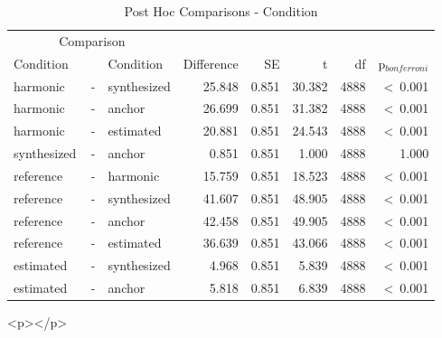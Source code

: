 \documentclass[a4paper,man,hidelinks,floatsintext]{apa7}
\begin{document}
    
\begin{table}[!htbp]
\caption{Post Hoc Comparisons - Condition}
\label{tab:Table_6}
\begin{adjustbox}{max size={\columnwidth}{\textheight}}
\centering
\begin{tabular}{lrlrrrrr}
\hline
\multicolumn{3}{c}{Comparison} & \multicolumn{5}{c}{~} \\
\cline{1-3}
Condition   & ~ & Condition   & Difference &    SE &      t &   df & p$_{bonferroni}$ \\
\hline
harmonic    & - & synthesized &     25.848 & 0.851 & 30.382 & 4888 &  \textless~0.001 \\
harmonic    & - & anchor      &     26.699 & 0.851 & 31.382 & 4888 &  \textless~0.001 \\
harmonic    & - & estimated   &     20.881 & 0.851 & 24.543 & 4888 &  \textless~0.001 \\
synthesized & - & anchor      &      0.851 & 0.851 &  1.000 & 4888 &            1.000 \\
reference   & - & harmonic    &     15.759 & 0.851 & 18.523 & 4888 &  \textless~0.001 \\
reference   & - & synthesized &     41.607 & 0.851 & 48.905 & 4888 &  \textless~0.001 \\
reference   & - & anchor      &     42.458 & 0.851 & 49.905 & 4888 &  \textless~0.001 \\
reference   & - & estimated   &     36.639 & 0.851 & 43.066 & 4888 &  \textless~0.001 \\
estimated   & - & synthesized &      4.968 & 0.851 &  5.839 & 4888 &  \textless~0.001 \\
estimated   & - & anchor      &      5.818 & 0.851 &  6.839 & 4888 &  \textless~0.001 \\
\hline
\end{tabular}
\end{adjustbox}
\begin{tablenotes} {
\small
}
\end{tablenotes}
\end{table}
      
        <p></p>
      
\end{document}
